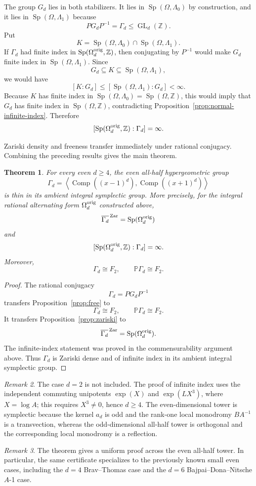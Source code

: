 \documentclass[a4paper,11pt]{amsart}
\newtheorem{theorem}{Theorem}[section]
\theoremstyle{remark}
\newtheorem{remark}[theorem]{Remark}
\newcommand{\Z}{\mathbb Z}
\newcommand{\PP}{\mathbb P}
\DeclareMathOperator{\Comp}{Comp}
\DeclareMathOperator{\GL}{GL}
\DeclareMathOperator{\Sp}{Sp}
\numberwithin{equation}{section}
\begin{document}
The group \(G_d\) lies in both stabilizers.  It lies in \(\Sp(\Omega,\Lambda_0)\) by construction, and it lies in \(\Sp(\Omega,\Lambda_1)\) because
\[
        PG_dP^{-1}=\Gamma_d\le\GL_d(\Z).
\]
Put
\[
        K=
        \Sp(\Omega,\Lambda_0)\cap\Sp(\Omega,\Lambda_1).
\]
If \(\Gamma_d\) had finite index in \(\Sp(\Omega_d^{\rm orig},\Z)\), then conjugating by \(P^{-1}\) would make \(G_d\) finite index in \(\Sp(\Omega,\Lambda_1)\).  Since
\[
        G_d\subseteq K\subseteq\Sp(\Omega,\Lambda_1),
\]
we would have
\[
        [K:G_d]\le[\Sp(\Omega,\Lambda_1):G_d]<\infty.
\]
Because \(K\) has finite index in \(\Sp(\Omega,\Lambda_0)=\Sp(\Omega,\Z)\), this would imply that \(G_d\) has finite index in \(\Sp(\Omega,\Z)\), contradicting Proposition~\ref{prop:normal-infinite-index}.  Therefore
\[
        [\Sp(\Omega_d^{\rm orig},\Z):\Gamma_d]=\infty.
\]

Zariski density and freeness transfer immediately under rational conjugacy.  Combining the preceding results gives the main theorem.

\begin{theorem}\label{thm:main}
For every even \(d\ge4\), the even all-half hypergeometric group
\[
        \Gamma_d=
        \left\langle
        \Comp((x-1)^d),\Comp((x+1)^d)
        \right\rangle
\]
is thin in its ambient integral symplectic group.  More precisely, for the integral rational alternating form \(\Omega_d^{\rm orig}\) constructed above,
\[
        \overline{\Gamma_d}^{\,\mathrm{Zar}}
        =
        \Sp(\Omega_d^{\rm orig})
\]
and
\[
        [\Sp(\Omega_d^{\rm orig},\Z):\Gamma_d]=\infty.
\]
Moreover,
\[
        \Gamma_d\cong F_2,
        \qquad
        \PP\Gamma_d\cong F_2.
\]
\end{theorem}

\begin{proof}
The rational conjugacy
\[
        \Gamma_d=PG_dP^{-1}
\]
transfers Proposition~\ref{prop:free} to
\[
        \Gamma_d\cong F_2,
        \qquad
        \PP\Gamma_d\cong F_2.
\]
It transfers Proposition~\ref{prop:zariski} to
\[
        \overline{\Gamma_d}^{\,\mathrm{Zar}}
        =
        \Sp(\Omega_d^{\rm orig}).
\]
The infinite-index statement was proved in the commensurability argument above.  Thus \(\Gamma_d\) is Zariski dense and of infinite index in its ambient integral symplectic group.
\end{proof}

\begin{remark}
The case \(d=2\) is not included.  The proof of infinite index uses the independent commuting unipotents \(\exp(X)\) and \(\exp(LX^3)\), where \(X=\log A\); this requires \(X^3\ne0\), hence \(d\ge4\).  The even-dimensional tower is symplectic because the kernel \(a_d\) is odd and the rank-one local monodromy \(BA^{-1}\) is a transvection, whereas the odd-dimensional all-half tower is orthogonal and the corresponding local monodromy is a reflection.
\end{remark}

\begin{remark}
The theorem gives a uniform proof across the even all-half tower.  In particular, the same certificate specializes to the previously known small even cases, including the \(d=4\) Brav--Thomas case and the \(d=6\) Bajpai--Dona--Nitsche \(A\)-1 case.
\end{remark}
\end{document}
